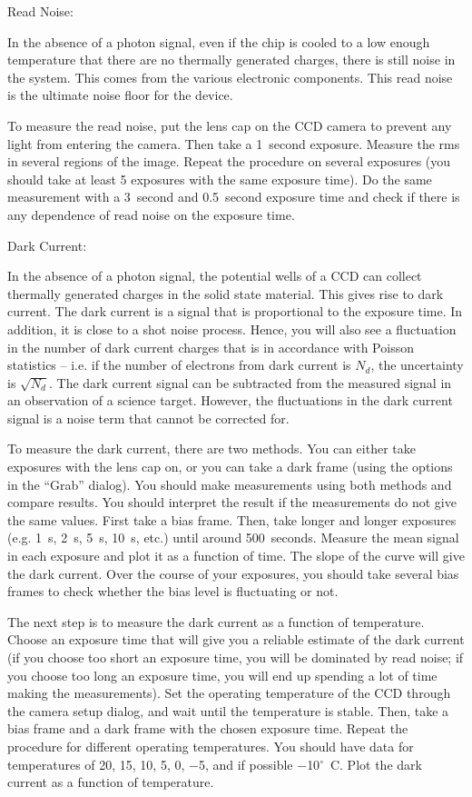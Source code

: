 \documentclass[a4paper,12pt]{article}
\begin{document}
\begin{enumerate}
{\bf \item Read Noise:} In the absence of a photon signal, even if the chip is cooled to a low enough temperature that there are no thermally generated charges, there is still noise in the system. This comes from the various electronic components. This read noise is the ultimate noise floor for the device. 

To measure the read noise, put the lens cap on the CCD camera to prevent any light from entering the camera. Then take a 1~second exposure. Measure the rms in several regions of the image. Repeat the procedure on several exposures (you should take at least 5 exposures with the same exposure time). Do the same measurement with a 3~second and 0.5~second exposure time and check if there is any dependence of read noise on the exposure time.

{\bf \item Dark Current:} In the absence of a photon signal, the potential wells of a CCD can collect thermally generated charges in the solid state material. This gives rise to dark current. The dark current is a signal that is proportional to the exposure time. In addition, it is close to a shot noise process. Hence, you will also see a fluctuation in the number of dark current charges that is in accordance with Poisson statistics -- i.e. if the number of electrons from dark current is $N_d$, the uncertainty is $\sqrt{N_d}$. The dark current signal can be subtracted from the measured signal in an observation of a science target. However, the fluctuations in the dark current signal is a noise term that cannot be corrected for.

To measure the dark current, there are two methods. You can either take exposures with the lens cap on, or you can take a dark frame (using the options in the ``Grab'' dialog). You should make measurements using both methods and compare results. You should interpret the result if the measurements do not give the same values. First take a bias frame. Then, take longer and longer exposures (e.g. 1~s, 2~s, 5~s, 10~s, etc.) until around 500~seconds. Measure the mean signal in each exposure and plot it as a function of time. The slope of the curve will give the dark current. Over the course of your exposures, you should take several bias frames to check whether the bias level is fluctuating or not.

The next step is to measure the dark current as a function of temperature. Choose an exposure time that will give you a reliable estimate of the dark current (if you choose too short an exposure time, you will be dominated by read noise; if you choose too long an exposure time, you will end up spending a lot of time making the measurements). Set the operating temperature of the CCD through the camera setup dialog, and wait until the temperature is stable. Then, take a bias frame and a dark frame with the chosen exposure time. Repeat the procedure for different operating temperatures. You should have data for temperatures of 20, 15, 10, 5, 0, $-$5, and if possible $-$10$^\circ$~C. Plot the dark current as a function of temperature.


\end{enumerate}
\end{document}
